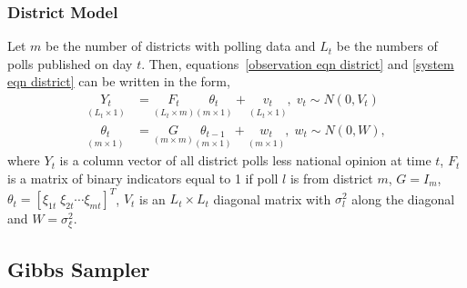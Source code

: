 \documentclass[12pt,final,fleqn]{article}
\theoremstyle{plain}
\begin{document}
\begin{appendices}
\subsubsection{District Model} 
Let $m$ be the number of districts with polling data and $L_t$ be the numbers of polls published on day $t$. Then, equations~\ref{observation eqn district} and \ref{system eqn district} can be written in the form,
\begin{align}
\label{eqn: dlm observation}
\underset{(L_t \times 1)}{Y_t} &= \underset{(L_t \times m)}{F_t} \underset{(m \times 1)}{\theta_t} + \underset{(L_t \times 1)}{v_t},\; v_t \sim N(0, V_t)\\
\label{eqn: dlm state}
\underset{(m \times 1)}{\theta_t} &= \underset{(m \times m)}{G}\underset{(m \times 1)}{\theta_{t-1}} + \underset{(m \times 1)}{w_t},\; w_t \sim N(0, W),
\end{align}
where $Y_t$ is a column vector of all district polls less national opinion at time $t$, $F_t$ is a matrix of binary indicators equal to 1 if poll $l$ is from district $m$, $G= I_m$, $\theta_t = [\xi_{1t}\; \xi_{2t}\cdots \xi_{mt}]^T$, $V_t$ is an $L_t \times L_t$ diagonal matrix with $\sigma^2_l$ along the diagonal and $W = \sigma^2_\xi$.

\subsection{Gibbs Sampler}

\end{appendices}
\end{document}
